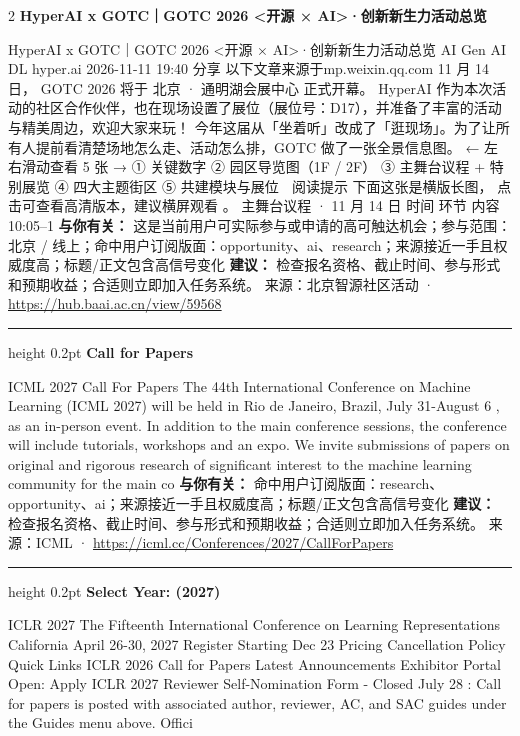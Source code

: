 \documentclass[10.5pt]{ctexart}
\begin{document}
\begin{multicols}{2}
{\large\bfseries HyperAI x GOTC｜GOTC 2026 <开源 × AI>·创新新生力活动总览}\par
HyperAI x GOTC｜GOTC 2026 <开源 × AI>·创新新生力活动总览 AI Gen AI DL hyper.ai 2026-11-11 19:40 分享 以下文章来源于mp.weixin.qq.com 11 月 14 日， GOTC 2026 将于 北京 · 通明湖会展中心 正式开幕。 HyperAI 作为本次活动的社区合作伙伴，也在现场设置了展位（展位号：D17），并准备了丰富的活动与精美周边，欢迎大家来玩！ 今年这届从「坐着听」改成了「逛现场」。为了让所有人提前看清楚场地怎么走、活动怎么排，GOTC 做了一张全景信息图。 ← 左右滑动查看 5 张 → ① 关键数字 ② 园区导览图（1F / 2F） ③ 主舞台议程 + 特别展览 ④ 四大主题街区 ⑤ 共建模块与展位 📱 阅读提示 下面这张是横版长图， 点击可查看高清版本，建议横屏观看 。 主舞台议程 · 11 月 14 日 时间 环节 内容 10:05–1
\textbf{与你有关：} 这是当前用户可实际参与或申请的高可触达机会；参与范围：北京 / 线上；命中用户订阅版面：opportunity、ai、research；来源接近一手且权威度高；标题/正文包含高信号变化
\textbf{建议：} 检查报名资格、截止时间、参与形式和预期收益；合适则立即加入任务系统。
{\footnotesize\color{ormuted} 来源：北京智源社区活动 · \url{https://hub.baai.ac.cn/view/59568}}
\vspace{2mm}
\hrule height 0.2pt
\vspace{2mm}
{\large\bfseries Call for Papers}\par
ICML 2027 Call For Papers The 44th International Conference on Machine Learning (ICML 2027) will be held in Rio de Janeiro, Brazil, July 31-August 6 , as an in-person event. In addition to the main conference sessions, the conference will include tutorials, workshops and an expo. We invite submissions of papers on original and rigorous research of significant interest to the machine learning community for the main co
\textbf{与你有关：} 命中用户订阅版面：research、opportunity、ai；来源接近一手且权威度高；标题/正文包含高信号变化
\textbf{建议：} 检查报名资格、截止时间、参与形式和预期收益；合适则立即加入任务系统。
{\footnotesize\color{ormuted} 来源：ICML · \url{https://icml.cc/Conferences/2027/CallForPapers}}
\vspace{2mm}
\hrule height 0.2pt
\vspace{2mm}
{\large\bfseries Select Year: (2027)}\par
ICLR 2027 The Fifteenth International Conference on Learning Representations California April 26-30, 2027 Register Starting Dec 23 Pricing Cancellation Policy Quick Links ICLR 2026 Call for Papers Latest Announcements Exhibitor Portal Open: Apply ICLR 2027 Reviewer Self-Nomination Form - Closed July 28 : Call for papers is posted with associated author, reviewer, AC, and SAC guides under the Guides menu above. Offici

\end{multicols}
\end{document}
